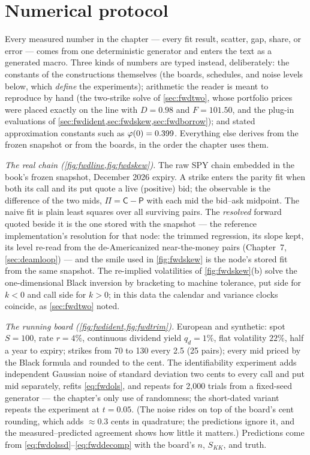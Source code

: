 \section{Numerical protocol}
\label{app:fwdprotocol}

Every measured number in the chapter --- every fit result, scatter,
gap, share, or error --- comes from one deterministic generator and
enters the text as a generated macro.  Three kinds of numbers are
typed instead, deliberately: the constants of the constructions
themselves (the boards, schedules, and noise levels below, which
\emph{define} the experiments); arithmetic the reader is meant to
reproduce by hand (the two-strike solve of \cref{sec:fwdtwo}, whose
portfolio prices were placed exactly on the line with $D=0.98$ and
$F=101.50$, and the plug-in evaluations of
\cref{sec:fwdident,sec:fwdskew,sec:fwdborrow}); and stated
approximation constants such as $\varphi(0)=0.399$.  Everything else
derives from the frozen snapshot or from the boards, in the order
the chapter uses them.

\emph{The real chain (\cref{fig:fwdline,fig:fwdskew}).}  The raw SPY
chain embedded in the book's frozen snapshot, December 2026 expiry.
A strike enters the parity fit when both its call and its put quote a
live (positive) bid; the observable is the difference of the two
mids, $\Pi=\mathsf{C}-\mathsf{P}$ with each mid the bid--ask
midpoint.  The naive fit is plain least squares over all surviving
pairs.  The \emph{resolved} forward quoted beside it is the one
stored with the snapshot --- the reference implementation's
resolution for that node: the trimmed regression, its slope kept, its
level re-read from the de-Americanized near-the-money pairs
(Chapter~7, \cref{sec:deamloop}) --- and the smile used in
\cref{fig:fwdskew} is the node's stored fit from the same snapshot.
The re-implied volatilities of \cref{fig:fwdskew}(b) solve the
one-dimensional Black inversion by bracketing to machine tolerance,
put side for $k<0$ and call side for $k>0$; in this data the
calendar and variance clocks coincide, as \cref{sec:fwdtwo} noted.

\emph{The running board
(\cref{fig:fwdident,fig:fwdtrim}).}  European and synthetic: spot
$S=100$, rate $r=4\%$, continuous dividend yield $q_d=1\%$, flat
volatility $22\%$, half a year to expiry; strikes from 70 to 130
every 2.5 (25 pairs); every mid priced by the Black formula and
rounded to the cent.  The identifiability experiment adds independent
Gaussian noise of standard deviation two cents to every call and put
mid separately, refits \eqref{eq:fwdols}, and repeats for 2{,}000
trials from a fixed-seed generator --- the chapter's only use of
randomness; the short-dated variant repeats the experiment at
$t=0.05$.  (The noise rides on top of the board's cent rounding,
which adds $\approx0.3$ cents in quadrature; the predictions ignore
it, and the measured--predicted agreement shows how little it
matters.)  Predictions come from
\eqref{eq:fwdolssd}--\eqref{eq:fwddecomp} with the board's
$n$, $S_{KK}$, and truth.

